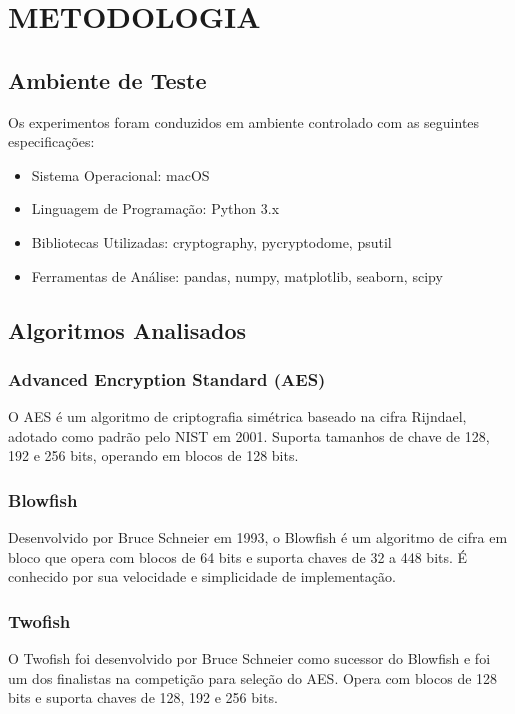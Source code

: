 \documentclass[12pt,a4paper,oneside]{article}
\begin{document}
\section{METODOLOGIA}

\subsection{Ambiente de Teste}

Os experimentos foram conduzidos em ambiente controlado com as seguintes especificações:

\begin{itemize}
    \item Sistema Operacional: macOS
    \item Linguagem de Programação: Python 3.x
    \item Bibliotecas Utilizadas: cryptography, pycryptodome, psutil
    \item Ferramentas de Análise: pandas, numpy, matplotlib, seaborn, scipy
\end{itemize}

\subsection{Algoritmos Analisados}

\subsubsection{Advanced Encryption Standard (AES)}

O AES é um algoritmo de criptografia simétrica baseado na cifra Rijndael, adotado como padrão pelo NIST em 2001. Suporta tamanhos de chave de 128, 192 e 256 bits, operando em blocos de 128 bits.

\subsubsection{Blowfish}

Desenvolvido por Bruce Schneier em 1993, o Blowfish é um algoritmo de cifra em bloco que opera com blocos de 64 bits e suporta chaves de 32 a 448 bits. É conhecido por sua velocidade e simplicidade de implementação.

\subsubsection{Twofish}

O Twofish foi desenvolvido por Bruce Schneier como sucessor do Blowfish e foi um dos finalistas na competição para seleção do AES. Opera com blocos de 128 bits e suporta chaves de 128, 192 e 256 bits.
\end{document}
